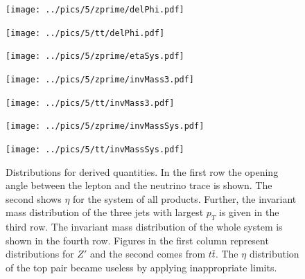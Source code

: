 \begin{figure}
\begin{center}
\begin{minipage}{\minwidth\textwidth}
 \texttt{[image: ../pics/5/zprime/delPhi.pdf]}
\end{minipage}
\begin{minipage}{\minwidth\textwidth}
 \texttt{[image: ../pics/5/tt/delPhi.pdf]}
\end{minipage}

\begin{minipage}{\minwidth\textwidth}
 \texttt{[image: ../pics/5/zprime/etaSys.pdf]}
\end{minipage}
\begin{minipage}{\minwidth\textwidth}
\end{minipage}


\begin{minipage}{\minwidth\textwidth}
 \texttt{[image: ../pics/5/zprime/invMass3.pdf]}
\end{minipage}
\begin{minipage}{\minwidth\textwidth}
 \texttt{[image: ../pics/5/tt/invMass3.pdf]}
\end{minipage}

\begin{minipage}{\minwidth\textwidth}
 \texttt{[image: ../pics/5/zprime/invMassSys.pdf]}
\end{minipage}
\begin{minipage}{\minwidth\textwidth}
 \texttt{[image: ../pics/5/tt/invMassSys.pdf]}
\end{minipage}
\end{center}
\caption{\small{Distributions for derived quantities. In the first row the opening angle between the lepton and the neutrino trace is shown. The second
shows $\eta$ for the system of all products. %
Further, the invariant
mass distribution of the three jets with largest $p_T$ is given in the third row. The invariant mass distribution of the whole system is shown
in the fourth row. Figures in the first column represent distributions for $Z'$ and the second comes from $t\bar t$. The $\eta$ distribution of the 
top pair became useless by applying inappropriate limits.}}
\label{pic:derived}
\end{figure}

